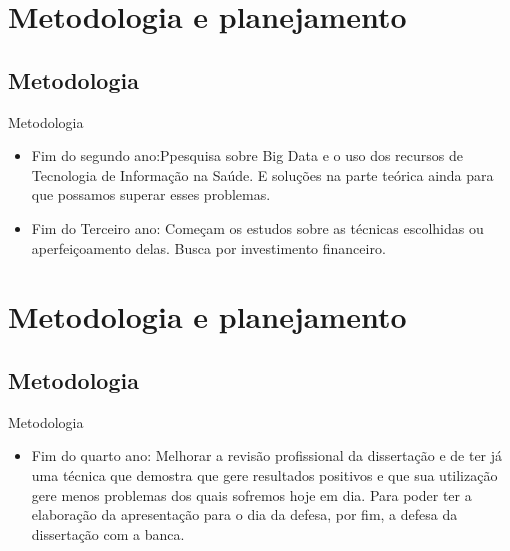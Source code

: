\documentclass{beamer}
\begin{document}
\section{Metodologia e planejamento}
\subsection{Metodologia}
\begin{frame}{Metodologia}
    \begin{itemize}
        \item{Fim do segundo ano:Ppesquisa sobre Big Data e o uso dos recursos de Tecnologia de Informação na Saúde. E soluções na parte teórica ainda para que possamos superar esses problemas.
        }
        \item{Fim do Terceiro ano: Começam os estudos sobre as técnicas escolhidas ou aperfeiçoamento delas. Busca por  investimento financeiro.}
    \end{itemize}
\end{frame}

\section{Metodologia e planejamento}
\subsection{Metodologia}
\begin{frame}{Metodologia}
    \begin{itemize}
    \item{Fim do quarto ano: Melhorar a revisão profissional da dissertação e de ter já uma técnica que demostra que gere resultados positivos e que sua utilização gere menos problemas dos quais sofremos hoje em dia. Para poder ter a elaboração da apresentação para o dia da defesa, por fim, a defesa da dissertação com a banca.
    }
    \end{itemize}
\end{frame}
\end{document}
